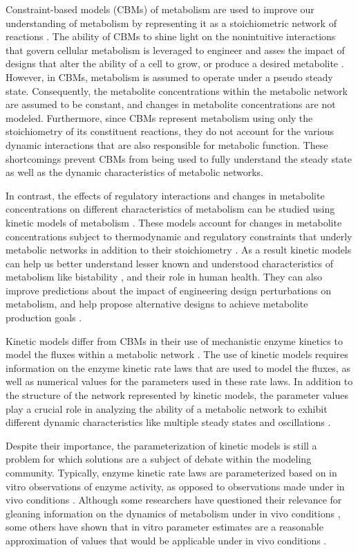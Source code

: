 \documentclass[10pt]{article}
\begin{document}
	Constraint-based models (CBMs) of metabolism are used to improve our understanding of metabolism by representing it as a stoichiometric network of reactions \parencite{Bordbar2014a}. The ability of CBMs to shine light on the nonintuitive interactions that govern cellular metabolism is leveraged to engineer and asses the impact of designs that alter the ability of a cell to grow, or produce a desired metabolite \parencite{Maia2016}. However, in CBMs, metabolism is assumed to operate under a pseudo steady state. Consequently, the metabolite concentrations within the metabolic network are assumed to be constant, and changes in metabolite concentrations are not modeled. Furthermore, since CBMs represent metabolism using only the stoichiometry of its constituent reactions, they do not account for the various dynamic interactions that are also responsible for metabolic function. These shortcomings prevent CBMs from being used to fully understand the steady state as well as the dynamic characteristics of metabolic networks. 
	
	In contrast, the effects of regulatory interactions and changes in metabolite concentrations on different characteristics of metabolism can be studied using kinetic models of metabolism \parencite{Saa2017}. These models account for changes in metabolite concentrations subject to thermodynamic and regulatory constraints that underly metabolic networks in addition to their stoichiometry \parencite{Link2014}. As a result kinetic models can help us better understand lesser known and understood characteristics of metabolism like bistability \parencite{Kotte2014}, and their role in human health. They can also improve predictions about the impact of engineering design perturbations on metabolism, and help propose alternative designs to achieve metabolite production goals \parencite{Khodayari2016}. 
	
	Kinetic models differ from CBMs in their use of mechanistic enzyme kinetics to model the fluxes within a metabolic network \parencite{Srinivasan2015,Saa2017}. The use of kinetic models requires information on the enzyme kinetic rate laws that are used to model the fluxes, as well as numerical values for the parameters used in these rate laws. In addition to the structure of the network represented by kinetic models, the parameter values play a crucial role in analyzing the ability of a metabolic network to exhibit different dynamic characteristics like multiple steady states and oscillations \parencite{Srinivasan2017}. 
	
	Despite their importance, the parameterization of kinetic models is still a problem for which solutions are a subject of debate within the modeling community. Typically, enzyme kinetic rate laws are parameterized based on in vitro observations of enzyme activity, as opposed to observations made under in vivo conditions \parencite{Heijnen2005,Smallbone2007}. Although some researchers have questioned their relevance for gleaning information on the dynamics of metabolism under in vivo conditions \parencite{Heijnen2005,Heijnen2013}, some others have shown that in vitro parameter estimates are a reasonable approximation of values that would be applicable under in vivo conditions \parencite{Davidi2016}. 
	
\end{document}

